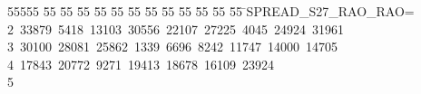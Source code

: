 %
%
\begin{tabbing}
55555 \= 55 \= 55 \= 55 \= 55 \= 55 \= 55 \= 55 \= 55 \= 55 \= 55 \= 55 \= 55 \= \>SPREAD\_S27\_RAO\_RAO=\\[0pt]
2\ 33879\ 5418\ 13103\ 30556\ 22107\ 27225\ 4045\ 24924\ 31961\ \\[0pt]
3\ 30100\ 28081\ 25862\ 1339\ 6696\ 8242\ 11747\ 14000\ 14705\ \\[0pt]
4\ 17843\ 20772\ 9271\ 19413\ 18678\ 16109\ 23924\\[0pt]
5\>\end{tabbing}
